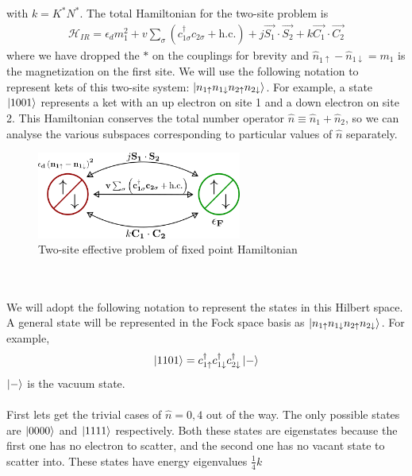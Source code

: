 \documentclass[twoside]{report}
\numberwithin{equation}{section}
\begin{document}
with \(k = K^* N^*\). The total Hamiltonian for the two-site problem is
\begin{equation}\begin{aligned}
	\mathcal{H}_{IR} = \epsilon_d m_1^2 + v\sum_{\sigma}\left(c^\dagger_{1\sigma}c_{2\sigma} + \text{h.c.} \right) + j\vec{S_1}\cdot\vec{S_2} + k \vec{C_1}\cdot\vec{C_2}
\end{aligned}\end{equation}
where we have dropped the \(*\) on the couplings for brevity and \(\hat n_{1 \uparrow} - \hat n_{1 \downarrow}=m_1\) is the magnetization on the first site. We will use the following notation to represent kets of this two-site system: \(\ket{n_{1 \uparrow}n_{1 \downarrow}n_{2 \uparrow}n_{2 \downarrow}}\). For example, a state \(\ket{1001}\) represents a ket with an up electron on site 1 and a down electron on site 2. This Hamiltonian conserves the total number operator \(\hat n \equiv \hat n_1 + \hat n_2\), so we can analyse the various subspaces corresponding to particular values of \(\hat n\) separately.
\begin{figure}[htpb]
	\centering
	\includegraphics[width=0.6\textwidth]{../figures/two_site_problem.png}
	\caption{Two-site effective problem of fixed point Hamiltonian}
	\label{twosite}

\end{figure}
\\\\We will adopt the following notation to represent the states in this Hilbert space. A general state will be represented in the Fock space basis as \(\ket{n_{1 \uparrow}n_{1 \downarrow}n_{2 \uparrow}n_{2 \downarrow}}\). For example,
\begin{equation}\begin{aligned}
	\ket{1101} = c^\dagger_{1 \uparrow}c^\dagger_{1 \downarrow}c^\dagger_{2 \downarrow}\ket{-}
\end{aligned}\end{equation}
\(\ket{-}\) is the vacuum state.
\\\\First lets get the trivial cases of \(\hat n = 0, 4\) out of the way. The only possible states are \(\ket{0000}\) and \(\ket{1111}\) respectively. Both these states are eigenstates because the first one has no electron to scatter, and the second one has no vacant state to scatter into. These states have energy eigenvalues \( \frac{1}{4}k\)
\end{document}
